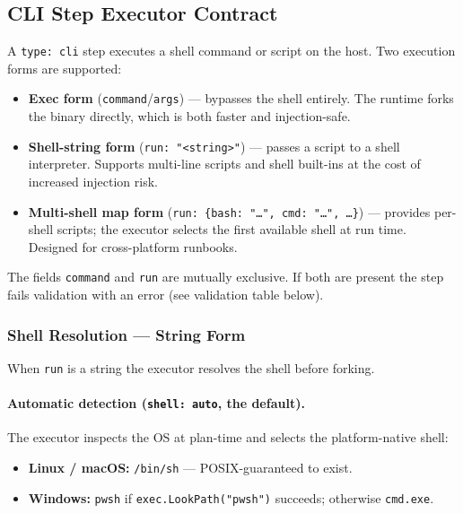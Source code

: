 \subsection{CLI Step Executor Contract}
\label{sec:cli_executor_contract}

A \texttt{type: cli} step executes a shell command or script on the host.  Two
execution forms are supported:

\begin{itemize}
  \item \textbf{Exec form} (\texttt{command}/\texttt{args}) — bypasses the shell
        entirely.  The runtime forks the binary directly, which is both faster and
        injection-safe.
  \item \textbf{Shell-string form} (\texttt{run: "<string>"}) — passes a script to a
        shell interpreter.  Supports multi-line scripts and shell built-ins at the cost
        of increased injection risk.
  \item \textbf{Multi-shell map form} (\texttt{run: \{bash: "…", cmd: "…", …\}}) —
        provides per-shell scripts; the executor selects the first available shell at
        run time.  Designed for cross-platform runbooks.
\end{itemize}

The fields \texttt{command} and \texttt{run} are mutually exclusive.  If both are
present the step fails validation with an error (see validation table below).

\subsubsection*{Shell Resolution — String Form}

When \texttt{run} is a string the executor resolves the shell before forking.

\paragraph{Automatic detection (\texttt{shell: auto}, the default).}
The executor inspects the OS at plan-time and selects the platform-native shell:

\begin{itemize}
  \item \textbf{Linux / macOS:} \texttt{/bin/sh} — POSIX-guaranteed to exist.
  \item \textbf{Windows:} \texttt{pwsh} if \texttt{exec.LookPath("pwsh")} succeeds;
        otherwise \texttt{cmd.exe}.
\end{itemize}

